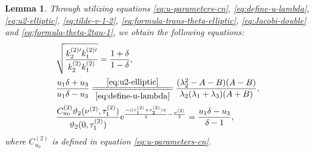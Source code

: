 \documentclass[11pt,reqno]{amsart}
\newcommand{\ii}{\mathrm{i}}
\newcommand{\ee}{\mathrm{e}}
\newtheorem{lemma}{Lemma}
\numberwithin{equation}{section}
\begin{document}
\begin{lemma}\label{lemma:parameter-check}
		Through utilizing equations \eqref{eq:u-parameters-cn}, \eqref{eq:define-u-lambda},\eqref{eq:u2-elliptic}, \eqref{eq:tilde-v-1-2}, \eqref{eq:formula-trans-theta-elliptic}, \eqref{eq:Jacobi-double} and  \eqref{eq:formula-theta-2tau-1},
		we obtain the following equations:
	\begin{subequations}\label{eq:equ-2}
		\begin{align}
			&\sqrt{\frac{  k^{(2)\prime}_2  k^{(2)\prime}_1}{k^{(2)}_2  k^{(2)}_1}}=
			\frac{1+\delta}{1-\delta}, \label{eq:equ-2-a}
			\\
			&\frac{u_1\delta+u_3}{u_1\delta-u_3}\xlongequal[\eqref{eq:define-u-lambda}]{\eqref{eq:u2-elliptic}}\frac{(\lambda_2^2-A-B)(A-B)}{\lambda_2(\lambda_1+\lambda_3)(A+B)},  \label{eq:equ-2-b}\\
			&\frac{C_{u_0}^{(2)}\vartheta_2( \nu^{(2)} , \tau^{(2)} _1)}{\vartheta_2(0, \tau^{(2)} _1)}\ee^{\frac{-\ii ( \tau^{(2)} _1+ \tau^{(2)} _2)\pi}{4}- \frac{\nu^{(2)}}{2} }
			=\frac{u_1\delta -u_3}{\delta-1}, \label{eq:equ-2-c}
		\end{align}
	\end{subequations}
	where $C_{u_0}^{(2)}$ is defined in equation \eqref{eq:u-parameters-cn}.
\end{lemma}
\end{document}
